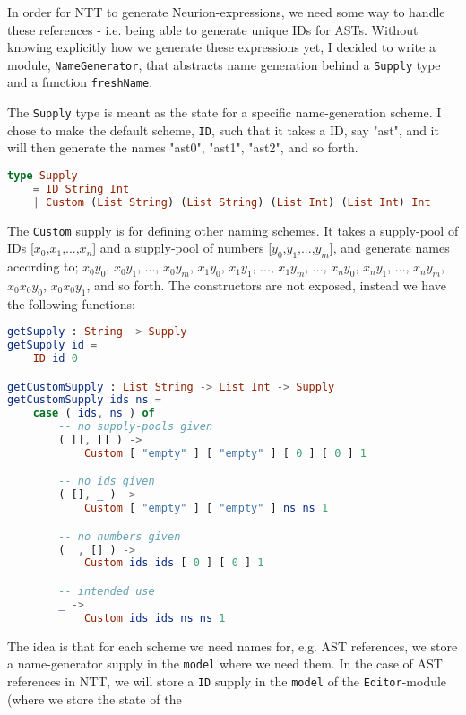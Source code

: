 \documentclass[10pt,a4paper,english]{article}
\begin{document}
In order for NTT to generate Neurion-expressions, we need some way to handle
these references - i.e. being able to generate unique IDs for ASTs.
Without knowing explicitly how we generate these expressions yet, I decided to
write a module, \texttt{NameGenerator}, that abstracts name generation behind a
\texttt{Supply} type and a function \texttt{freshName}.

The \texttt{Supply} type is meant as the state for a specific name-generation
scheme. I chose to make the default scheme, \texttt{ID}, such that it takes a
ID, say "ast", and it will then generate the names "ast0", "ast1", "ast2", and
so forth.
\begin{lstlisting}[language=elm,%
                     label="eval-evaluated",%
                     gobble=0,%
                     ]
type Supply
    = ID String Int
    | Custom (List String) (List String) (List Int) (List Int) Int
\end{lstlisting}
The \texttt{Custom} supply is for defining other naming schemes. It takes a
supply-pool of IDs [$x_0$,$x_1$,...,$x_n$] and a supply-pool of numbers
[$y_0$,$y_1$,...,$y_m$], and generate names according to; $x_0y_0$, $x_0y_1$,
..., $x_0y_m$, $x_1y_0$, $x_1y_1$, ..., $x_1y_m$, ..., $x_ny_0$, $x_ny_1$, ...,
$x_ny_m$, $x_0x_0y_0$, $x_0x_0y_1$, and so forth. The constructors are not
exposed, instead we have the following functions:
\begin{lstlisting}[language=elm,%
                     label="eval-evaluated",%
                     gobble=0,%
                     ]
getSupply : String -> Supply
getSupply id =
    ID id 0

getCustomSupply : List String -> List Int -> Supply
getCustomSupply ids ns =
    case ( ids, ns ) of
        -- no supply-pools given
        ( [], [] ) ->
            Custom [ "empty" ] [ "empty" ] [ 0 ] [ 0 ] 1

        -- no ids given
        ( [], _ ) ->
            Custom [ "empty" ] [ "empty" ] ns ns 1

        -- no numbers given
        ( _, [] ) ->
            Custom ids ids [ 0 ] [ 0 ] 1

        -- intended use
        _ ->
            Custom ids ids ns ns 1
\end{lstlisting}
The idea is that for each scheme we need names for, e.g. AST references, we
store a name-generator supply in the \texttt{model} where we need them. In the
case of AST references in NTT, we will store a \texttt{ID} supply in the
\texttt{model} of the \texttt{Editor}-module (where we store the state of the
\end{document}
